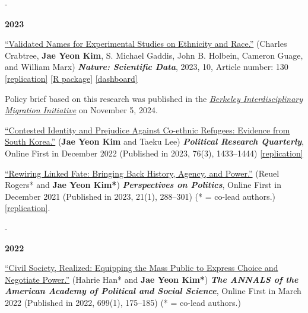 \documentclass[10pt, letterpaper]{article}
\makeatletter
\newcommand{\needspace}[1]{%
  \par\penalty-100\begingroup
  \setlength{\dimen@}{#1}%
  \dimen@ii\pagegoal \advance\dimen@ii-\pagetotal
  \ifdim\dimen@>\dimen@ii \break\fi
  \endgroup
}
\newcommand{\pubyear}[1]{\needspace{6\baselineskip}\item[]\vspace{0.3\baselineskip}\textbf{#1}}
\renewenvironment{itemize}{
\begin{list}{}{
        \setlength{\leftmargin}{1.5em}
        \setlength{\itemsep}{0.10em}
        \setlength{\parskip}{0pt}
        \setlength{\parsep}{0.10em}
    }
}{
\end{list}
}
\makeatother
\begin{document}
\begin{etaremune}
\pubyear{2023}
\item \href{https://www.nature.com/articles/s41597-023-01947-0#Sec10}{``Validated Names for Experimental Studies on Ethnicity and Race.''} (Charles Crabtree, \textbf{Jae Yeon Kim}, S. Michael Gaddis, John B. Holbein, Cameron Guage, and William Marx) \textbf{\textit{Nature: Scientific Data}}, 2023, 10, Article number: 130 \href{https://github.com/jaeyk/validated_names}{[replication]} \href{https://github.com/jaeyk/validatednamesr}{[R package]} \href{https://jaeyk.github.io/select_validated_names/?fbclid=IwY2xjawP0TOlleHRuA2FlbQIxMABicmlkETFIdVoxek4zU0p0SFhzZXZJc3J0YwZhcHBfaWQQMjIyMDM5MTc4ODIwMDg5MgABHm5a4tquUfrPydahJ1v3TX_HaLK7plqgT8aORGfWqVaYnyGDFhm4VdK0zE_h_aem_KusnJygN3w44M1hksHeycw}{[dashboard]}
\begin{itemize}
    \item Policy brief based on this research was published in the \textit{\href{https://bimi.berkeley.edu/sites/default/files/bimi_policy_brief_crabtree_validated_names.pdf}{Berkeley Interdisciplinary Migration Initiative}} on November 5, 2024.
\end{itemize}

\item \href{https://journals.sagepub.com/doi/10.1177/10659129221144248}{``Contested Identity and Prejudice Against Co-ethnic Refugees: Evidence from South Korea.''} (\textbf{Jae Yeon Kim} and Taeku Lee) \textbf{\textit{Political Research Quarterly}}, Online First in December 2022 (Published in 2023, 76(3), 1433--1444) \href{https://github.com/jaeyk/contested-identity}{[replication]}

\item \href{https://www.cambridge.org/core/journals/perspectives-on-politics/article/rewiring-linked-fate-bringing-back-history-agency-and-power/CF08421CA51138DF922AB05F056E80B7}{``Rewiring Linked Fate: Bringing Back History, Agency, and Power.''} (Reuel Rogers* and \textbf{Jae Yeon Kim*}) \textbf{\textit{Perspectives on Politics}}, Online First in December 2021 (Published in 2023, 21(1), 288--301) (* = co-lead authors.) \href{https://github.com/jaeyk/linked_fate_review/}{[replication]}.

\pubyear{2022}
\item \href{https://journals.sagepub.com/doi/full/10.1177/00027162221077471}{``Civil Society, Realized: Equipping the Mass Public to Express Choice and Negotiate Power.''} (Hahrie Han* and \textbf{Jae Yeon Kim*}) \textbf{\textit{The ANNALS of the American Academy of Political and Social Science}}, Online First in March 2022 (Published in 2022, 699(1), 175--185) (* = co-lead authors.)


\end{etaremune}
\end{document}
